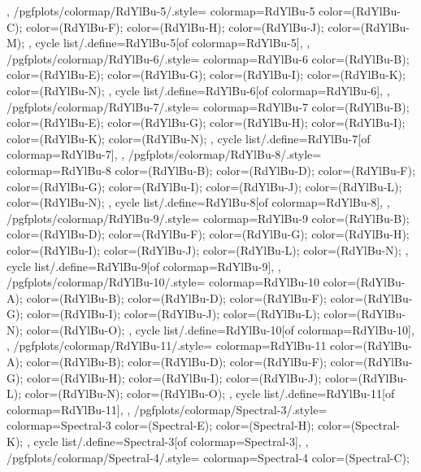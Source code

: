 {{  },
  /pgfplots/colormap/RdYlBu-5/.style={
    colormap={RdYlBu-5}{
      color=(RdYlBu-C);
      color=(RdYlBu-F);
      color=(RdYlBu-H);
      color=(RdYlBu-J);
      color=(RdYlBu-M);
    },
    cycle list/.define={RdYlBu-5}{[of colormap=RdYlBu-5]},
  },
  /pgfplots/colormap/RdYlBu-6/.style={
    colormap={RdYlBu-6}{
      color=(RdYlBu-B);
      color=(RdYlBu-E);
      color=(RdYlBu-G);
      color=(RdYlBu-I);
      color=(RdYlBu-K);
      color=(RdYlBu-N);
    },
    cycle list/.define={RdYlBu-6}{[of colormap=RdYlBu-6]},
  },
  /pgfplots/colormap/RdYlBu-7/.style={
    colormap={RdYlBu-7}{
      color=(RdYlBu-B);
      color=(RdYlBu-E);
      color=(RdYlBu-G);
      color=(RdYlBu-H);
      color=(RdYlBu-I);
      color=(RdYlBu-K);
      color=(RdYlBu-N);
    },
    cycle list/.define={RdYlBu-7}{[of colormap=RdYlBu-7]},
  },
  /pgfplots/colormap/RdYlBu-8/.style={
    colormap={RdYlBu-8}{
      color=(RdYlBu-B);
      color=(RdYlBu-D);
      color=(RdYlBu-F);
      color=(RdYlBu-G);
      color=(RdYlBu-I);
      color=(RdYlBu-J);
      color=(RdYlBu-L);
      color=(RdYlBu-N);
    },
    cycle list/.define={RdYlBu-8}{[of colormap=RdYlBu-8]},
  },
  /pgfplots/colormap/RdYlBu-9/.style={
    colormap={RdYlBu-9}{
      color=(RdYlBu-B);
      color=(RdYlBu-D);
      color=(RdYlBu-F);
      color=(RdYlBu-G);
      color=(RdYlBu-H);
      color=(RdYlBu-I);
      color=(RdYlBu-J);
      color=(RdYlBu-L);
      color=(RdYlBu-N);
    },
    cycle list/.define={RdYlBu-9}{[of colormap=RdYlBu-9]},
  },
  /pgfplots/colormap/RdYlBu-10/.style={
    colormap={RdYlBu-10}{
      color=(RdYlBu-A);
      color=(RdYlBu-B);
      color=(RdYlBu-D);
      color=(RdYlBu-F);
      color=(RdYlBu-G);
      color=(RdYlBu-I);
      color=(RdYlBu-J);
      color=(RdYlBu-L);
      color=(RdYlBu-N);
      color=(RdYlBu-O);
    },
    cycle list/.define={RdYlBu-10}{[of colormap=RdYlBu-10]},
  },
  /pgfplots/colormap/RdYlBu-11/.style={
    colormap={RdYlBu-11}{
      color=(RdYlBu-A);
      color=(RdYlBu-B);
      color=(RdYlBu-D);
      color=(RdYlBu-F);
      color=(RdYlBu-G);
      color=(RdYlBu-H);
      color=(RdYlBu-I);
      color=(RdYlBu-J);
      color=(RdYlBu-L);
      color=(RdYlBu-N);
      color=(RdYlBu-O);
    },
    cycle list/.define={RdYlBu-11}{[of colormap=RdYlBu-11]},
  },
  /pgfplots/colormap/Spectral-3/.style={
    colormap={Spectral-3}{
      color=(Spectral-E);
      color=(Spectral-H);
      color=(Spectral-K);
    },
    cycle list/.define={Spectral-3}{[of colormap=Spectral-3]},
  },
  /pgfplots/colormap/Spectral-4/.style={
    colormap={Spectral-4}{
      color=(Spectral-C);
}}}
